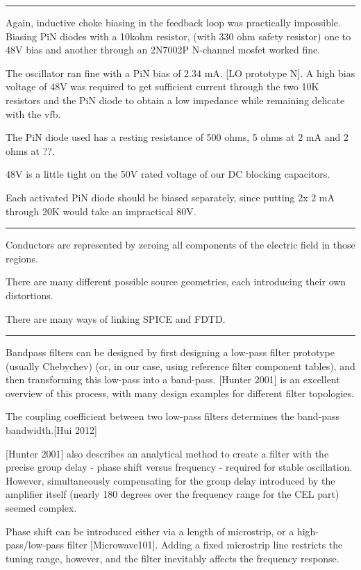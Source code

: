 \documentclass[paper.tex]{subfiles}
\begin{document}
\rule{\linewidth}{0.2pt}

Again, inductive choke biasing in the feedback loop was practically impossible. Biasing PiN diodes with a 10kohm resistor, (with 330 ohm safety resistor) one to 48V bias and another through an 2N7002P N-channel mosfet worked fine. 

The oscillator ran fine with a PiN bias of 2.34 mA. [LO prototype N]. A high bias voltage of 48V was required to get sufficient current through the two 10K resistors and the PiN diode to obtain a low impedance while remaining delicate with the vfb.

The PiN diode used has a resting resistance of 500 ohms, 5 ohms at 2 mA and 2 ohms at ??. 

48V is a little tight on the 50V rated voltage of our DC blocking capacitors.

Each activated PiN diode should be biased separately, since putting 2x 2 mA through 20K would take an impractical 80V.

\rule{\linewidth}{0.2pt}

Conductors are represented by zeroing all components of the electric field in those regions. 

There are many different possible source geometries, each introducing their own distortions.

There are many ways of linking SPICE and FDTD. 

\rule{\linewidth}{0.2pt}

Bandpass filters can be designed by first designing a low-pass filter prototype (usually Chebychev) (or, in our case, using reference filter component tables), and then transforming this low-pass into a band-pass. [Hunter 2001] is an excellent overview of this process, with many design examples for different filter topologies. 

The coupling coefficient between two low-pass filters determines the band-pass bandwidth.[Hui 2012]

[Hunter 2001] also describes an analytical method to create a filter with the precise group delay - phase shift versus frequency - required for stable oscillation. However, simultaneously compensating for the group delay introduced by the amplifier itself (nearly 180 degrees over the frequency range for the CEL part) seemed complex.

Phase shift can be introduced either via a length of microstrip, or a high-pass/low-pass filter [Microwave101]. Adding a fixed microstrip line restricts the tuning range, however, and the filter inevitably affects the frequency response.  
\end{document}
